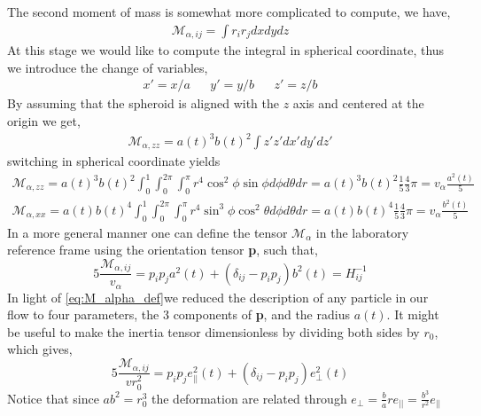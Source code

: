 The second moment of mass is somewhat more complicated to compute, we have, 
\begin{align*}
    \mathcal{M}_{\alpha,ij}
    = \int r_ir_j dxdydz
\end{align*}
At this stage we would like to compute the integral in spherical coordinate, thus we introduce the change of variables, 
\begin{align*}
    x' = x/a 
    && y' = y/b 
    && z' = z/b 
\end{align*}
By assuming that the spheroid is aligned with the $z$ axis and centered at the origin we get, 
\begin{align*}
    \mathcal{M}_{\alpha,zz}
    = a(t)^3 b(t)^2 \int z'z' dx'dy'dz'
\end{align*}
switching in spherical coordinate yields 
\begin{align*}
    \mathcal{M}_{\alpha,zz}
    = a(t)^3 b(t)^2 \int_0^1 \int_0^{2\pi}\int_0^\pi r^4 \cos^2\phi \sin\phi d\phi d\theta dr
    = a(t)^3 b(t)^2 \frac{1}{5}\frac{4}{3} \pi
    = v_\alpha \frac{a^2(t)}{5}\\
    \mathcal{M}_{\alpha,xx}
    = a(t) b(t)^4 \int_0^1 \int_0^{2\pi}\int_0^\pi r^4 \sin^3\phi\cos^2\theta d\phi d\theta dr
    = a(t) b(t)^4
    \frac{1}{5}
     \frac{4}{3}
     \pi
     =v_\alpha \frac{b^2(t)}{5}
\end{align*}
In a more general manner one can define the tensor $\mathcal{M}_\alpha$ in the laboratory reference frame using the orientation tensor \textbf{p}, such that, 
\begin{equation}
    5 \frac{\mathcal{M}_{\alpha,ij}}{v_\alpha}
    = p_i p_j 
    a^2(t) 
    + (\delta_{ij} - p_ip_j) b^2(t)
    = H_{ij}^{-1}
    \label{eq:M_alpha_def}
\end{equation} 
In light of \ref{eq:M_alpha_def}we reduced the description of any particle in our flow to four parameters, the 3 components of \textbf{p}, and the radius $a(t)$. 
It might be useful to make the inertia tensor dimensionless by dividing both sides by $r_0$, which gives, 
\begin{equation}
    5 \frac{\mathcal{M}_{\alpha,ij}}{v r_0^2}
    = p_i p_j 
    e_{||}^2(t) 
    + (\delta_{ij} - p_ip_j) 
    e_\bot^2(t) 
    \label{eq:M_alpha_def2}
\end{equation} 
Notice that since $ab^2 =r_0^3$ the deformation are related through $e_\bot = \frac{b}{a}r e_{||} =\frac{b^3}{r^2} e_{||} $


